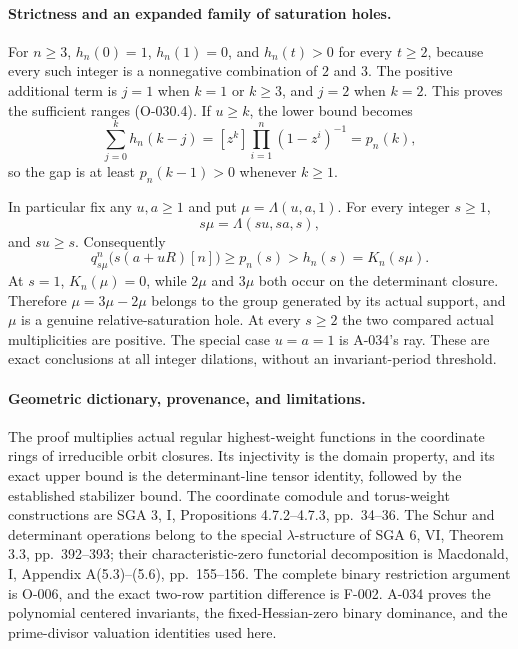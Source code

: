 \paragraph{Strictness and an expanded family of saturation holes.}
For \(n\geq3\), \(h_n(0)=1\), \(h_n(1)=0\), and
\(h_n(t)>0\) for every \(t\geq2\), because every such
integer is a nonnegative combination of \(2\) and \(3\).
The positive additional term is \(j=1\) when \(k=1\)
or \(k\geq3\), and \(j=2\) when \(k=2\).
This proves the sufficient ranges (O-030.4).
If \(u\geq k\), the lower bound becomes
\[
 \sum_{j=0}^{k}h_n(k-j)
     =[z^k]\prod_{i=1}^{n}(1-z^i)^{-1}=p_n(k),
                                                               \tag{O-030.10}
\]
so the gap is at least \(p_n(k-1)>0\) whenever \(k\geq1\).

In particular fix any \(u,a\geq1\) and put
\(\mu=\Lambda(u,a,1)\). For every integer \(s\geq1\),
\[
                 s\mu=\Lambda(su,sa,s),
\]
and \(su\geq s\). Consequently
\[
 \boxed{\displaystyle
 q^n_{s\mu}\bigl(s(a+uR)[n]\bigr)
       \geq p_n(s)>h_n(s)=K_n(s\mu).}                          \tag{O-030.11}
\]
At \(s=1\), \(K_n(\mu)=0\), while \(2\mu\) and \(3\mu\)
both occur on the determinant closure. Therefore
\(\mu=3\mu-2\mu\) belongs to the group generated by its
actual support, and \(\mu\) is a genuine relative-saturation
hole. At every \(s\geq2\) the two compared actual
multiplicities are positive. The special case \(u=a=1\)
is A-034's ray. These are exact conclusions at all
integer dilations, without an invariant-period threshold.

\paragraph{Geometric dictionary, provenance, and limitations.}
The proof multiplies actual regular highest-weight
functions in the coordinate rings of irreducible orbit
closures. Its injectivity is the domain property, and
its exact upper bound is the determinant-line tensor
identity, followed by the established stabilizer bound.
The coordinate comodule and torus-weight constructions
are SGA 3, I, Propositions 4.7.2--4.7.3, pp.~34--36.
The Schur and determinant operations belong to the
special \(\lambda\)-structure of SGA 6, VI, Theorem 3.3,
pp.~392--393; their characteristic-zero functorial
decomposition is Macdonald, I, Appendix A(5.3)--(5.6),
pp.~155--156. The complete binary restriction argument
is O-006, and the exact two-row partition difference is
F-002. A-034 proves the polynomial centered invariants,
the fixed-Hessian-zero binary dominance, and the
prime-divisor valuation identities used here.

